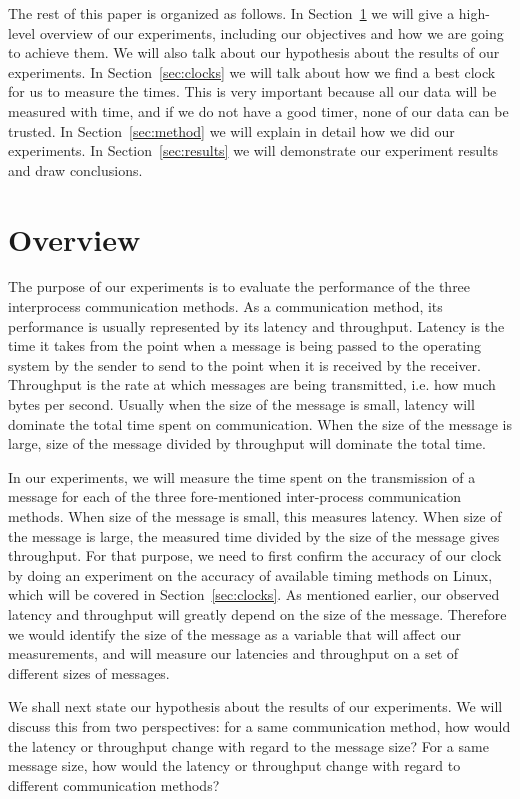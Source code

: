 \documentclass[11pt,conference]{IEEEtran}
\begin{document}
The rest of this paper is organized as follows.
In Section~\ref{sec:overview} we will give a high-level overview of our experiments, including our objectives and how we are going to achieve them.
We will also talk about our hypothesis about the results of our experiments.
In Section~\ref{sec:clocks} we will talk about how we find a best clock for us to measure the times.
This is very important because all our data will be measured with time, and if we do not have a good timer, none of our data can be trusted.
In Section~\ref{sec:method} we will explain in detail how we did our experiments.
In Section~\ref{sec:results} we will demonstrate our experiment results and draw conclusions.

\section{Overview}
\label{sec:overview}
The purpose of our experiments is to evaluate the performance of the three interprocess communication methods.
As a communication method, its performance is usually represented by its latency and throughput.
Latency is the time it takes from the point when a message is being passed to the operating system by the sender to send to the point when it is received by the receiver.
Throughput is the rate at which messages are being transmitted, i.e. how much bytes per second.
Usually when the size of the message is small, latency will dominate the total time spent on communication.
When the size of the message is large, size of the message divided by throughput will dominate the total time.

In our experiments, we will measure the time spent on the transmission of a message for each of the three fore-mentioned inter-process communication methods.
When size of the message is small, this measures latency.
When size of the message is large, the measured time divided by the size of the message gives throughput.
For that purpose, we need to first confirm the accuracy of our clock by doing an experiment on the accuracy of available timing methods on Linux, which will be covered in Section~\ref{sec:clocks}.
As mentioned earlier, our observed latency and throughput will greatly depend on the size of the message.
Therefore we would identify the size of the message as a variable that will affect our measurements, and will measure our latencies and throughput on a set of different sizes of messages.

We shall next state our hypothesis about the results of our experiments.
We will discuss this from two perspectives: for a same communication method, how would the latency or throughput change with regard to the message size?
For a same message size, how would the latency or throughput change with regard to different communication methods?
\end{document}
